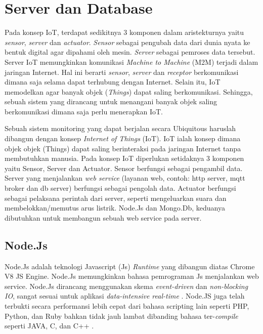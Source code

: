 \section{Server dan Database}
Pada konsep IoT, terdapat sedikitnya 3 komponen dalam aristekturnya yaitu \textit{sensor}, \textit{server} dan \textit{actuator}. \textit{Sensor} sebagai pengubah data dari dunia nyata ke bentuk digital agar dipahami oleh mesin. \textit{Server} sebagai pemroses data tersebut. Server
IoT memungkinkan komunikasi \textit{Machine to Machine} (M2M) terjadi dalam jaringan Internet. Hal ini berarti \textit{sensor}, \textit{server} dan \textit{receptor} berkomunikasi dimana saja selama dapat terhubung dengan Internet. Selain itu, IoT memodelkan agar banyak objek (\textit{Things}) dapat saling berkomunikasi. Sehingga, sebuah sistem yang dirancang untuk menangani banyak objek saling berkomunikasi dimana saja perlu menerapkan IoT.

Sebuah sistem monitoring yang dapat berjalan secara Ubiquitous haruslah dibangun dengan konsep \textit{Internet of Things} (IoT). IoT ialah konsep dimana objek objek (Things) dapat saling berinteraksi pada jaringan Internet tanpa membutuhkan manusia. Pada konsep IoT diperlukan setidaknya 3 komponen yaitu Sensor, Server dan Actuator. Sensor berfungsi sebagai pengambil data. Server yang menjalankan \textit{web service} (layanan web, contoh: http server, mqtt broker dan db server) berfungsi sebagai pengolah data. Actuator berfungsi sebagai pelaksana perintah dari server, seperti mengeluarkan suara dan membelokkan/memutus arus listrik. Node.Js dan Mongo.Db, keduanya dibutuhkan untuk membangun sebuah web service pada server.

\subsection{Node.Js}
Node.Js adalah teknologi Javascript (Js) \textit{Runtime} yang dibangun diatas Chrome V8 JS Engine. Node.Js memungkinkan bahasa pemrograman Js menjalankan web service. Node.Js dirancang menggunakan skema \textit{event-driven} dan \textit{non-blocking IO}, sangat sesuai untuk aplikasi \textit{data-intensive real-time} \cite{nodejs}. Node.JS juga telah terbukti secara performansi lebih cepat dari bahasa scripting lain seperti PHP, Python, dan Ruby bahkan tidak jauh lambat dibanding bahasa ter-\textit{compile} seperti JAVA, C, dan C++ \cite{node_comparisson}.


